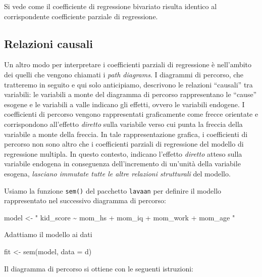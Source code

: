 \documentclass[
  11pt,
]{krantz}
\makeatletter
\newenvironment{Shaded}{\begin{snugshade}}{\end{snugshade}}
\newcommand{\AttributeTok}[1]{\textcolor[rgb]{0.61,0.61,0.61}{#1}}
\newcommand{\FunctionTok}[1]{\textcolor[rgb]{0,0,0}{#1}}
\newcommand{\NormalTok}[1]{#1}
\newcommand{\OtherTok}[1]{\textcolor[rgb]{0.37,0.37,0.37}{#1}}
\newcommand{\StringTok}[1]{\textcolor[rgb]{0.5,0.5,0.5}{#1}}
\newenvironment{kframe}{%
\medskip{}
\setlength{\fboxsep}{.8em}
 \def\at@end@of@kframe{}%
 \ifinner\ifhmode%
  \def\at@end@of@kframe{\end{minipage}}%
  \begin{minipage}{\columnwidth}%
 \fi\fi%
 \def\FrameCommand##1{\hskip\@totalleftmargin \hskip-\fboxsep
 \colorbox{shadecolor}{##1}\hskip-\fboxsep
     \hskip-\linewidth \hskip-\@totalleftmargin \hskip\columnwidth}%
 \MakeFramed {\advance\hsize-\width
   \@totalleftmargin\z@ \linewidth\hsize
   \@setminipage}}%
 {\par\unskip\endMakeFramed%
 \at@end@of@kframe}
\renewenvironment{Shaded}{\begin{kframe}}{\end{kframe}}
\theoremstyle{definition}
\theoremstyle{definition}
\theoremstyle{definition}
\theoremstyle{definition}
\theoremstyle{remark}
\makeatother
\begin{document}
Si vede come il coefficiente di regressione bivariato risulta identico al corrispondente coefficiente parziale di regressione.

\hypertarget{relazioni-causali}{%
\subsection{Relazioni causali}\label{relazioni-causali}}

Un altro modo per interpretare i coefficienti parziali di regressione è nell'ambito dei quelli che vengono chiamati i \emph{path diagrams}. I diagrammi di percorso, che tratteremo in seguito e qui solo anticipiamo, descrivono le relazioni ``causali'' tra variabili: le variabili a monte del diagramma di percorso rappresentano le ``cause'' esogene e le variabili a valle indicano gli effetti, ovvero le variabili endogene. I coefficienti di percorso vengono rappresentati graficamente come frecce orientate e corrispondono all'effetto \emph{diretto} sulla variabile verso cui punta la freccia della variabile a monte della freccia. In tale rappresentazione grafica, i coefficienti di percorso non sono altro che i coefficienti parziali di regressione del modello di regressione multipla. In questo contesto, indicano l'effetto \emph{diretto} atteso sulla variabile endogena in conseguenza dell'incremento di un'unità della variabile esogena, \emph{lasciano immutate tutte le altre relazioni strutturali} del modello.

Usiamo la funzione \texttt{sem()} del pacchetto \texttt{lavaan} per definire il modello rappresentato nel successivo diagramma di percorso:

\begin{Shaded}
\begin{Highlighting}[]
\NormalTok{model }\OtherTok{\textless{}{-}} \StringTok{"}
\StringTok{  kid\_score \textasciitilde{} mom\_hs + mom\_iq + mom\_work + mom\_age}
\StringTok{"}
\end{Highlighting}
\end{Shaded}

Adattiamo il modello ai dati

\begin{Shaded}
\begin{Highlighting}[]
\NormalTok{fit }\OtherTok{\textless{}{-}} \FunctionTok{sem}\NormalTok{(model, }\AttributeTok{data =}\NormalTok{ d)}
\end{Highlighting}
\end{Shaded}

Il diagramma di percorso si ottiene con le seguenti istruzioni:
\end{document}
